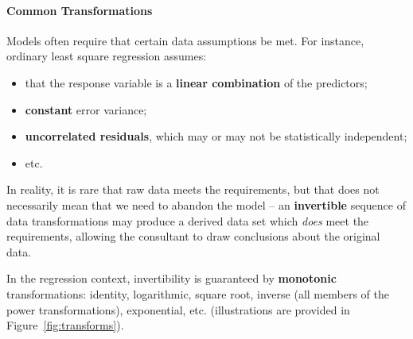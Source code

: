 \paragraph{Common Transformations} Models often require that certain data assumptions be met. For instance, ordinary least square regression assumes:
\begin{itemize}[noitemsep]
\item that the response variable is a \textbf{linear combination} of the predictors;
\item \textbf{constant} error variance; 
\item \textbf{uncorrelated residuals}, which may or may not be statistically independent;
\item etc.
\end{itemize}
In reality, it is rare that raw data  meets the requirements, but that does not necessarily mean that we need to abandon the model -- an \textbf{invertible} sequence of data transformations may produce a derived data set which \textit{does} meet the requirements, allowing the consultant to draw conclusions about the original data. \par In the regression context, invertibility is guaranteed by \textbf{monotonic} transformations:  identity, logarithmic, square root, inverse (all members of the power transformations), exponential, etc. (illustrations are provided in Figure~\ref{fig:transforms}).
